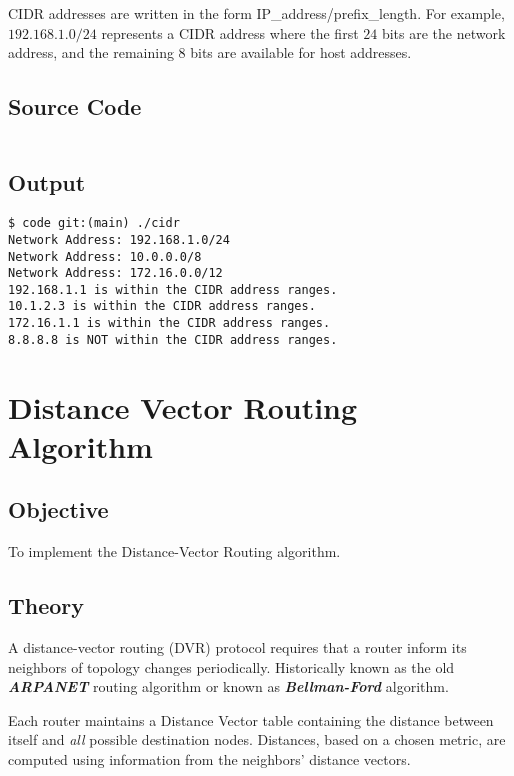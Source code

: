 \documentclass{korigamik}
\begin{document}
CIDR addresses are written in the form IP\_address/prefix\_length. For example,
$192.168.1.0/24$ represents a CIDR address where the first $24$ bits are the
network address, and the remaining 8 bits are available for host addresses.

\subsection{Source Code}

\inputminted[firstline=9, fontsize=\footnotesize]{cpp}{code/cidr.cpp}

\subsection{Output}

\begin{lstlisting}[style=output]
$ code git:(main) ./cidr
Network Address: 192.168.1.0/24
Network Address: 10.0.0.0/8
Network Address: 172.16.0.0/12
192.168.1.1 is within the CIDR address ranges.
10.1.2.3 is within the CIDR address ranges.
172.16.1.1 is within the CIDR address ranges.
8.8.8.8 is NOT within the CIDR address ranges.
\end{lstlisting}

\iffalse
\pagebreak

\section{Distance Vector Routing Algorithm}
\label{sec:Distance Vector Routing Algorithm}

\subsection{Objective}
To implement the Distance-Vector Routing algorithm.

\subsection{Theory}
A distance-vector routing (DVR) protocol requires that a router inform its
neighbors of topology changes periodically. Historically known as the old
\textbf{\textit{ARPANET}} routing algorithm or known as \textbf{\textit{Bellman-Ford}} algorithm.

Each router maintains a Distance Vector table containing the distance between
itself and \textit{all} possible destination nodes. Distances, based on a
chosen metric, are computed using information from the neighbors' distance
vectors.
\end{document}
